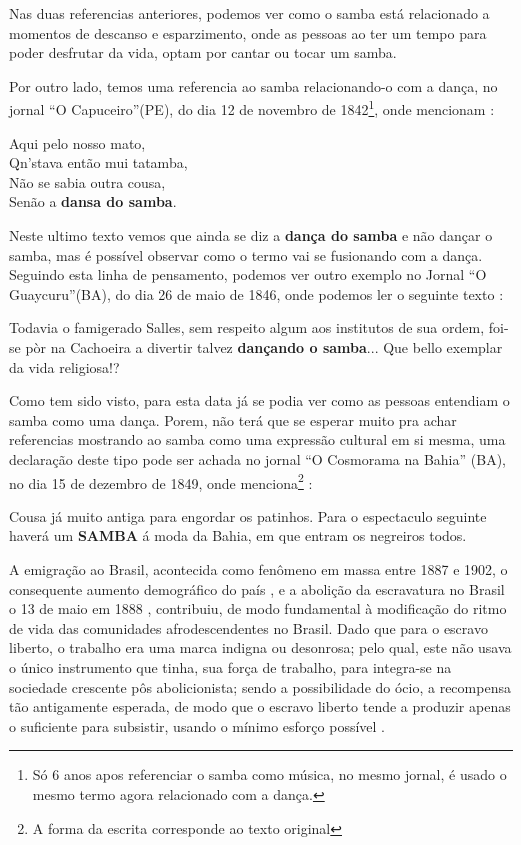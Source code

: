 Nas duas referencias anteriores, 
podemos ver como o samba está relacionado a momentos de descanso e esparzimento, 
onde as pessoas ao ter um tempo para poder desfrutar da vida,
optam por cantar ou tocar um samba.

Por outro lado, temos uma referencia ao samba relacionando-o com a dança, no jornal ``O Capuceiro''(PE),
do dia 12 de novembro de 1842\footnote{Só 6 anos apos referenciar o samba como música, 
no mesmo jornal, é usado o mesmo termo agora relacionado com a dança.}, 
onde mencionam \cite[pp. 5]{sambaperiodicoocapuceiro2}:
\begin{citando}%
Aqui pelo nosso mato,\\
Qn'stava então mui tatamba,\\
Não se sabia outra cousa,\\
Senão a \textbf{dansa do samba}.
\end{citando}
Neste ultimo texto vemos que ainda se diz a \textbf{dança do samba} e não dançar o samba,
mas é possível observar como o termo vai se fusionando com a dança.
Seguindo esta linha de pensamento, 
podemos ver outro exemplo no Jornal ``O Guaycuru''(BA), do dia 26 de maio de 1846,
onde podemos ler o seguinte texto \cite[pp. 2]{sambaperiodicooguaycuru}:
\begin{citando}%
Todavia o famigerado Salles, sem respeito algum aos institutos de sua ordem, 
foi-se pòr na Cachoeira a divertir talvez \textbf{dançando o samba}...
Que bello exemplar da vida religiosa!?
\end{citando}
Como tem sido visto, 
para esta data já se podia ver como as pessoas entendiam o samba como uma dança.
Porem, não terá que se esperar muito pra achar referencias mostrando ao samba
como uma expressão cultural em si mesma, 
uma declaração deste tipo pode ser achada no jornal ``O Cosmorama na Bahia'' (BA), 
no dia 15 de dezembro de 1849, onde menciona\footnote{\label{footort3}A forma da escrita corresponde ao texto original} \cite[pp. 2]{sambaperiodicoocosmorama}:
\begin{citando}%
Cousa já muito antiga para engordar os patinhos. 
Para o espectaculo seguinte haverá um \textbf{SAMBA} á moda da Bahia, 
em que entram os negreiros todos.
\end{citando}

\PRLsep{*}


A emigração ao Brasil, acontecida como fenômeno em massa   entre 1887 e 1902,
o consequente aumento demográfico do país \cite[pp. 18]{trento1989outro}, e 
a abolição da escravatura no Brasil o 13 de maio em 1888 \cite[pp. 117]{dorigny2019abolicoes},
contribuiu, de modo fundamental à modificação do ritmo de vida das comunidades
afrodescendentes no Brasil.
Dado que para o escravo liberto, o trabalho era uma marca indigna ou desonrosa;
pelo qual, este não usava  o único instrumento que tinha, sua força de trabalho, 
para  integra-se na sociedade crescente pôs abolicionista; 
sendo a possibilidade do ócio, a recompensa tão antigamente esperada, 
de modo que o escravo liberto tende a produzir apenas o suficiente para subsistir,
usando o mínimo esforço possível \cite[pp. 28]{durham1966assimilacao} \cite[pp. 25]{trento1989outro}.

